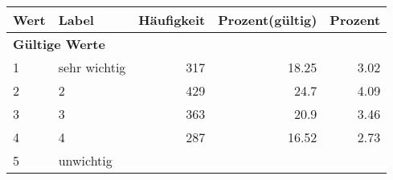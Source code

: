      \begin{longtable}{lXrrr}
     \toprule
     \textbf{Wert} & \textbf{Label} & \textbf{Häufigkeit} & \textbf{Prozent(gültig)} & \textbf{Prozent} \\
     \endhead
     \midrule
     \multicolumn{5}{l}{\textbf{Gültige Werte}}\\

     1 &
     \multicolumn{1}{X}{ sehr wichtig   } &


       \num{317} &
       \num[round-mode=places,round-precision=2]{18,25} &
         \num[round-mode=places,round-precision=2]{3,02} \\

     2 &
     \multicolumn{1}{X}{ 2   } &


       \num{429} &
       \num[round-mode=places,round-precision=2]{24,7} &
         \num[round-mode=places,round-precision=2]{4,09} \\

     3 &
     \multicolumn{1}{X}{ 3   } &


       \num{363} &
       \num[round-mode=places,round-precision=2]{20,9} &
         \num[round-mode=places,round-precision=2]{3,46} \\

     4 &
     \multicolumn{1}{X}{ 4   } &


       \num{287} &
       \num[round-mode=places,round-precision=2]{16,52} &
         \num[round-mode=places,round-precision=2]{2,73} \\

     5 &
     \multicolumn{1}{X}{ unwichtig   } &



\end{longtable}
